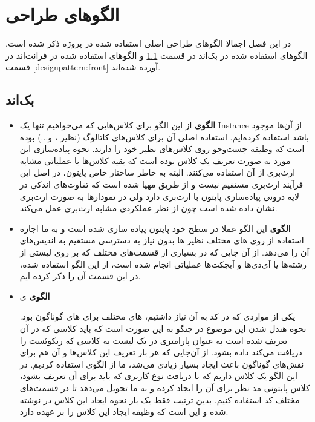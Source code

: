 \chapter{
الگوهای طراحی
}

در این فصل اجمالا الگوهای طراحی اصلی استفاده شده در پروژه ذکر شده است. الگوهای استفاده شده در بک‌اند در قسمت \ref{designpattern:back} و الگوهای استفاده شده در فرانت‌اند در قسمت \ref{designpattern:front} آورده شده‌اند.

\newpage
\section{بک‌اند}
\label{designpattern:back}

\begin{itemize}
	\item 
	\textbf{الگوی }
	از این الگو برای کلاس‌هایی که می‌خواهیم تنها یک Instance از آن‌ها موجود باشد استفاده کرده‌ایم. استفاده اصلی آن برای کلاس‌های کاتالوگ (نظیر ،  و...) بوده است که وظیفه جست‌وجو روی کلاس‌های نظیر خود را دارند. نحوه پیاده‌سازی این مورد به صورت تعریف یک کلاس  بوده است که بقیه کلاس‌ها با عملیاتی مشابه ارث‌بری از آن استفاده می‌کنند. البته به خاطر ساختار خاص پایتون، در اصل این فرآیند ارث‌بری مستقیم نیست و از طریق  مهیا شده است که تفاوت‌های اندکی در لایه درونی پیاده‌سازی پایتون با ارث‌بری دارد ولی در نمودارها به صورت ارث‌بری نشان داده شده است چون از نظر عملکردی مشابه ارث‌بری عمل می‌کند.
	
	\item 
	\textbf{الگوی }
	این الگو عملا در سطح خود پایتون پیاده سازی شده است و به ما اجازه استفاده از  روی  های مختلف نظیر  ها بدون نیاز به دسترسی مستقیم به اندیس‌های آن را می‌دهد. از آن جایی که در بسیاری از قسمت‌های مختلف که بر روی لیستی از رشته‌ها یا آی‌دی‌ها و آبجکت‌ها عملیاتی انجام شده است، از این الگو استفاده شده، در این قسمت آن را ذکر کرده ایم.
	
	\item 
	\textbf{الگوی }ی
	
	یکی از مواردی که در کد به آن نیاز داشتیم،  های مختلف برای  های گوناگون بود. نحوه هندل شدن این موضوع در جنگو به این صورت است که باید کلاسی که  در آن تعریف شده است به عنوان پارامتری در یک لیست به کلاسی که ریکوئست را دریافت می‌کند داده بشود. از آن‌جایی که هر بار تعریف این کلاس‌ها و آن هم برای نقش‌های گوناگون باعث ایجاد  بسیار زیادی می‌شد، ما از الگوی  استفاده کردیم. در این الگو یک کلاس  داریم که با دریافت نوع کاربری که باید برای آن  تعریف بشود، کلاس پایتونی مد نظر برای آن را ایجاد کرده و به ما تحویل می‌دهد تا در قسمت‌های مختلف کد استفاده کنیم. بدین ترتیب فقط یک بار نحوه ایجاد این کلاس در  نوشته شده و این  است که وظیفه ایجاد این کلاس را بر عهده دارد.
	

\end{itemize}
